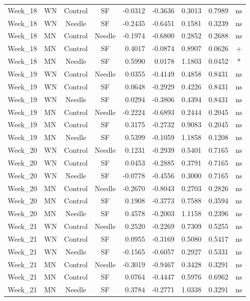 \documentclass[
  12pt,
  letterpaper,
]{article}
\begin{document}
\begin{longtable}{llccrrrlc}
Week\_18 & WN & Control & SF & -0.0312 & -0.3636 & 0.3013 & 0.7989 & ns \\ 
Week\_18 & WN & Needle & SF & -0.2435 & -0.6451 & 0.1581 & 0.3239 & ns \\ 
Week\_18 & MN & Control & Needle & -0.1974 & -0.6800 & 0.2852 & 0.2688 & ns \\ 
Week\_18 & MN & Control & SF & 0.4017 & -0.0874 & 0.8907 & 0.0626 & + \\ 
Week\_18 & MN & Needle & SF & 0.5990 & 0.0178 & 1.1803 & 0.0452 & * \\ 
Week\_19 & WN & Control & Needle & 0.0355 & -0.4149 & 0.4858 & 0.8431 & ns \\ 
Week\_19 & WN & Control & SF & 0.0648 & -0.2929 & 0.4226 & 0.8431 & ns \\ 
Week\_19 & WN & Needle & SF & 0.0294 & -0.3806 & 0.4394 & 0.8431 & ns \\ 
Week\_19 & MN & Control & Needle & -0.2224 & -0.6893 & 0.2444 & 0.2045 & ns \\ 
Week\_19 & MN & Control & SF & 0.3175 & -0.2732 & 0.9083 & 0.2045 & ns \\ 
Week\_19 & MN & Needle & SF & 0.5399 & -0.1059 & 1.1858 & 0.1208 & ns \\ 
Week\_20 & WN & Control & Needle & 0.1231 & -0.2939 & 0.5401 & 0.7165 & ns \\ 
Week\_20 & WN & Control & SF & 0.0453 & -0.2885 & 0.3791 & 0.7165 & ns \\ 
Week\_20 & WN & Needle & SF & -0.0778 & -0.4556 & 0.3000 & 0.7165 & ns \\ 
Week\_20 & MN & Control & Needle & -0.2670 & -0.8043 & 0.2703 & 0.2826 & ns \\ 
Week\_20 & MN & Control & SF & 0.1908 & -0.3773 & 0.7588 & 0.3594 & ns \\ 
Week\_20 & MN & Needle & SF & 0.4578 & -0.2003 & 1.1158 & 0.2396 & ns \\ 
Week\_21 & WN & Control & Needle & 0.2520 & -0.2269 & 0.7309 & 0.5255 & ns \\ 
Week\_21 & WN & Control & SF & 0.0955 & -0.3169 & 0.5080 & 0.5417 & ns \\ 
Week\_21 & WN & Needle & SF & -0.1565 & -0.6057 & 0.2927 & 0.5331 & ns \\ 
Week\_21 & MN & Control & Needle & -0.3019 & -0.9467 & 0.3428 & 0.3291 & ns \\ 
Week\_21 & MN & Control & SF & 0.0764 & -0.4447 & 0.5976 & 0.6962 & ns \\ 
Week\_21 & MN & Needle & SF & 0.3784 & -0.2771 & 1.0338 & 0.3291 & ns \\ 

\end{longtable}
\end{document}

